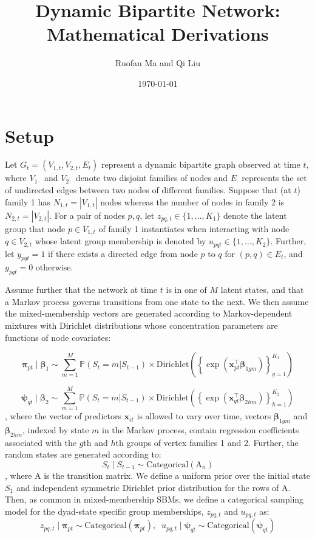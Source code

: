 \documentclass{article}
\title{Dynamic Bipartite Network: Mathematical Derivations}
\author{Ruofan Ma and Qi Liu}
\date{\today}
\begin{document}
\maketitle

\section{Setup}

Let $G_t = (V_{1,t}, V_{2,t}, E_t)$ represent a dynamic bipartite graph observed at time $t$, where $V_{1 \cdot}$ and $V_{2 \cdot}$ denote two disjoint families of nodes and $E_{\cdot}$ represents the set of undirected edges between two nodes of different families. Suppose that (at $t$) family 1 has $N_{1,t} = |V_{1,t}|$ nodes whereas the number of nodes in family 2 is $N_{2,t} = |V_{2 ,t}|$. For a pair of nodes $p,q$, let $z_{pq,t} \in \{1, \dots, K_{1}\}$ denote the latent group that node $p \in V_{1,t}$ of family 1 instantiates when interacting with node $q \in V_{2,t}$ whose latent group membership is denoted by $u_{pqt} \in \{1, \dots, K_{2}\}$. Further, let $y_{pqt} = 1$ if there exists a directed edge from node $p$ to $q$ for $(p,q) \in E_t$, and $y_{pqt} = 0$ otherwise. \par

Assume further that the network at time $t$ is in one of $M$ latent states, and that a Markov process governs transitions from one state to the next. We then assume the mixed-membership vectors are generated according to Markov-dependent mixtures with Dirichlet distributions whose concentration parameters are functions of node covariates:

$$
\boldsymbol{\pi}_{pt} \mid \boldsymbol{\beta}_{1} \sim \sum_{m=1}^M \mathbb{P}\left(S_t = m |  S_{t-1}\right) \times \mathrm{Dirichlet}\left( \left\{ \exp \left( \mathbf{x}^\top_{pt} \boldsymbol{\beta}_{1gm} \right)  \right\}_{g=1}^{K_1} \right)
$$

$$
\boldsymbol{\psi}_{qt} \mid \boldsymbol{\beta}_{2} \sim \sum_{m=1}^M \mathbb{P}\left(S_t = m |  S_{t-1}\right) \times \mathrm{Dirichlet}\left( \left\{ \exp \left( \mathbf{x}^\top_{qt} \boldsymbol{\beta}_{2hm} \right)  \right\}_{h=1}^{K_2} \right)
$$
, where the vector of predictors $\boldsymbol{x}_{it}$ is allowed to vary over time, vectors $\boldsymbol{\beta}_{1gm}$ and $\boldsymbol{\beta}_{2hm}$, indexed by state $m$ in the Markov process, contain regression coefficients associated with the $g$th and $h$th groups of vertex families 1 and 2. Further, the random states are generated according to:
$$
S_t \mid S_{t-1} \sim \mathrm{Categorical}(\mathrm{A}_n)
$$
, where $\mathrm{A}$ is the transition matrix. We define a uniform prior over the initial state $S_1$ and independent symmetric Dirichlet prior distribution for the rows of $\mathrm{A}$. Then, as common in mixed-membership SBMs, we define a categorical sampling model for the dyad-state specific group memberships, $z_{pq,t}$ and $u_{pq,t}$ as:
$$
z_{pq,t} \mid \boldsymbol{\pi}_{pt} \sim \mathrm{Categorical}(\boldsymbol{\pi}_{pt}),  \; \; u_{pq,t} \mid \boldsymbol{\psi}_{qt} \sim \mathrm{Categorical}(\boldsymbol{\psi}_{qt})
$$
\end{document}

